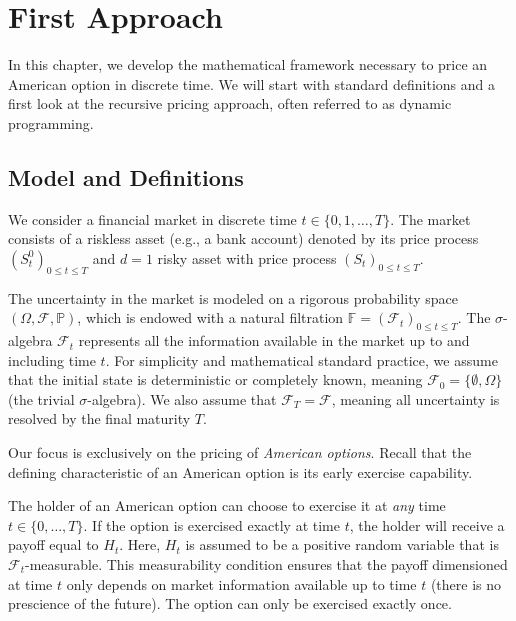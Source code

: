 \chapter{First Approach}

In this chapter, we develop the mathematical framework necessary to price an American option in discrete time. We will start with standard definitions and a first look at the recursive pricing approach, often referred to as dynamic programming.

\section{Model and Definitions}

\begin{definition}
We consider a financial market in discrete time $t \in \{0, 1, \dots, T\}$. 
The market consists of a riskless asset (e.g., a bank account) denoted by its price process $(S^0_t)_{0 \leq t \leq T}$ and $d=1$ risky asset with price process $(S_t)_{0 \leq t \leq T}$. 

The uncertainty in the market is modeled on a rigorous probability space $(\Omega, \mathcal{F}, \mathbb{P})$, which is endowed with a natural filtration $\mathbb{F} = (\mathcal{F}_{t})_{0 \leq t \leq T}$. 
The $\sigma$-algebra $\mathcal{F}_t$ represents all the information available in the market up to and including time $t$. 
For simplicity and mathematical standard practice, we assume that the initial state is deterministic or completely known, meaning $\mathcal{F}_{0} = \{\emptyset, \Omega\}$ (the trivial $\sigma$-algebra). We also assume that $\mathcal{F}_{T} = \mathcal{F}$, meaning all uncertainty is resolved by the final maturity $T$.
\end{definition}

Our focus is exclusively on the pricing of \textit{American options}. Recall that the defining characteristic of an American option is its early exercise capability. 

\begin{definition}
The holder of an American option can choose to exercise it at \textit{any} time $t \in \{0, \dots, T\}$. If the option is exercised exactly at time $t$, the holder will receive a payoff equal to $H_{t}$.
Here, $H_{t}$ is assumed to be a positive random variable that is $\mathcal{F}_{t}$-measurable. This measurability condition ensures that the payoff dimensioned at time $t$ only depends on market information available up to time $t$ (there is no prescience of the future). The option can only be exercised exactly once.
\end{definition}

